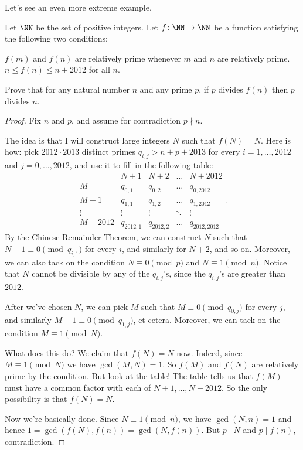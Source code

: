 \documentclass[11pt]{scrartcl}
\begin{document}
Let's see an even more extreme example.
\begin{example}
  [TSTST 2012/3]
  Let $\NN$ be the set of positive integers.
  Let $f \colon \NN \to \NN$ be a function satisfying the following two conditions:
  \begin{enumerate}[(a)]
   \ii $f(m)$ and $f(n)$ are relatively prime whenever $m$ and $n$ are relatively prime.
   \ii $n \le f(n) \le n+2012$ for all $n$.
  \end{enumerate}
  Prove that for any natural number $n$ and any prime $p$,
  if $p$ divides $f(n)$ then $p$ divides $n$.
\end{example}
\begin{proof}
  Fix $n$ and $p$, and assume for contradiction $p \nmid n$.

  The idea is that I will construct large integers $N$
  such that $f(N) = N$.
  Here is how: pick $2012 \cdot 2013$ distinct primes $q_{i,j} > n+p+2013$
  for every $i=1,\dots,2012$ and $j=0,\dots,2012$,
  and use it to fill in the following table:
  \[
    \begin{array}{c|cccc}
      & N+1 & N+2 & \dots & N+2012 \\ \hline
      M & q_{0,1} & q_{0,2} & \dots & q_{0,2012} \\
      M+1 & q_{1,1} & q_{1,2} & \dots & q_{1,2012} \\
      \vdots & \vdots & \vdots & \ddots & \vdots \\
      M+2012 & q_{2012,1} & q_{2012,2} & \dots & q_{2012,2012}
    \end{array}.
  \]
  By the Chinese Remainder Theorem, we can construct $N$
  such that $N+1 \equiv 0 \pmod{q_{i,1}}$ for every $i$,
  and similarly for $N+2$, and so on.
  Moreover, we can also tack on the condition $N \equiv 0 \pmod p$
  and $N \equiv 1 \pmod n$.
  Notice that $N$ cannot be divisible by any of the $q_{i,j}$'s,
  since the $q_{i,j}$'s are greater than $2012$.

  After we've chosen $N$, we can pick $M$ such that $M \equiv 0 \pmod{q_{0,j}}$ for every $j$,
  and similarly $M+1 \equiv 0 \pmod{q_{1,j}}$, et cetera.
  Moreover, we can tack on the condition $M \equiv 1 \pmod N$.

  What does this do?
  We claim that $f(N) = N$ now.
  Indeed, since $M \equiv 1 \pmod N$ we have $\gcd(M,N) = 1$.
  So $f(M)$ and $f(N)$ are relatively prime by the condition.
  But look at the table!
  The table tells us that $f(M)$ must have a common factor
  with each of $N+1, \dots, N+2012$.
  So the only possibility is that $f(N) = N$.

  Now we're basically done.
  Since $N \equiv 1 \pmod n$, we have $\gcd(N,n) = 1$
  and hence $1 = \gcd(f(N), f(n)) = \gcd(N, f(n))$.
  But $p \mid N$ and $p \mid f(n)$, contradiction.
\end{proof}
\end{document}
